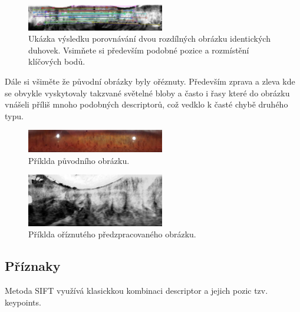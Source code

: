 \documentclass[a4paper,10pt,twocolumn]{article}
\begin{document}
\begin{figure}[H]
       \begin{center}
              \includegraphics[width=6cm]{imgs/example_match.png}
       \end{center}
       \caption{Ukázka výsledku porovnávání dvou rozdílných obrázku identických
       duhovek. Vsimňete si především podobné pozice a rozmístění klíčových bodů.}
       \label{fig3}
\end{figure}

Dále si všiměte že původní obrázky byly ořéznuty. Především zprava a zleva kde se obvykle vyskytovaly takzvané světelné bloby a často i řasy které do obrázku vnášeli příliš mnoho podobných descriptorů, což vedklo k časté chybě druhého typu.

\begin{figure}[H]
    \begin{center}
        \includegraphics[width=6cm]{imgs/original_with_blobs.png}
    \end{center}
    \caption{Příklda původního obrázku.}
    \label{fig3}
\end{figure}

\begin{figure}[H]
    \begin{center}
        \includegraphics[width=6cm]{imgs/croped.png}
    \end{center}
    \caption{Příklda oříznutého předzpracovaného obrázku.}
    \label{fig3}
\end{figure}


\subsection{Příznaky}

Metoda SIFT využívá klasickkou kombinaci descriptor a jejich pozic tzv. keypoints.
\end{document}
